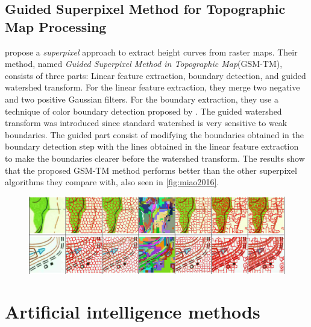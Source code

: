 \subsection{Guided Superpixel Method for Topographic Map Processing}
\citet{Miao2016} propose a \emph{superpixel}\cite{Ren2003} approach to extract height curves from raster maps. Their method, named \emph{Guided Superpixel Method in Topographic Map}(GSM-TM), consists of three parts: Linear feature extraction, boundary detection, and guided watershed transform. For the linear feature extraction, they merge two negative and two positive Gaussian filters. For the boundary extraction, they use a technique of color boundary detection proposed by \citet{Yang2013}. The guided watershed transform was introduced since standard watershed is very sensitive to weak boundaries. The guided part consist of modifying the boundaries obtained in the boundary detection step with the lines obtained in the linear feature extraction to make the boundaries clearer before the watershed transform. The results show that the proposed GSM-TM method performs better than the other superpixel algorithms they compare with, also seen in \autoref{fig:miao2016}. 

\begin{figure}[H]
	\centering
	\includegraphics[width=0.9\linewidth]{fig/miao2016.png}
	\label{fig:miao2016}
\end{figure}

\section{Artificial intelligence methods}

